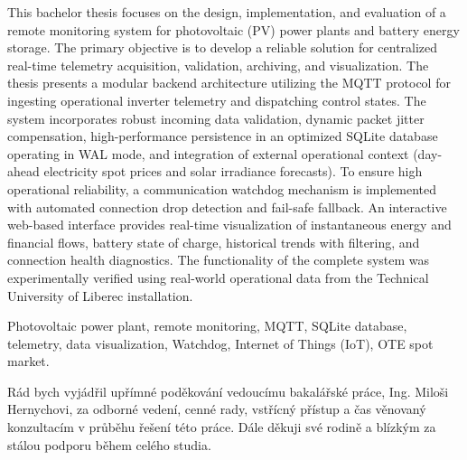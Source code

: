 \documentclass[FM,BP]{tulthesis}
\begin{document}
	\begin{abstractEN}
	This bachelor thesis focuses on the design, implementation, and evaluation of a remote
	monitoring system for photovoltaic (PV) power plants and battery energy storage.
	The primary objective is to develop a reliable solution for centralized real-time telemetry
	acquisition, validation, archiving, and visualization. The thesis presents a modular backend
	architecture utilizing the MQTT protocol for ingesting operational inverter telemetry and
	dispatching control states. The system incorporates robust incoming data validation,
	dynamic packet jitter compensation, high-performance persistence in an optimized SQLite
	database operating in WAL mode, and integration of external operational context (day-ahead
	electricity spot prices and solar irradiance forecasts). To ensure high operational reliability,
	a communication watchdog mechanism is implemented with automated connection drop detection
	and fail-safe fallback. An interactive web-based interface provides real-time visualization
	of instantaneous energy and financial flows, battery state of charge, historical trends
	with filtering, and connection health diagnostics. The functionality of the complete system
	was experimentally verified using real-world operational data from the Technical University
	of Liberec installation.
	\end{abstractEN}

	\begin{keywordsEN}
	Photovoltaic power plant, remote monitoring, MQTT, SQLite database, telemetry,
	data visualization, Watchdog, Internet of Things (IoT), OTE spot market.
	\end{keywordsEN}

	\clearpage

	\begin{acknowledgement}
	Rád bych vyjádřil upřímné poděkování vedoucímu bakalářské práce,
	Ing. Miloši Hernychovi, za odborné vedení, cenné rady, vstřícný přístup
	a čas věnovaný konzultacím v průběhu řešení této práce. Dále děkuji
	své rodině a blízkým za stálou podporu během celého studia.
	\end{acknowledgement}
\end{document}
